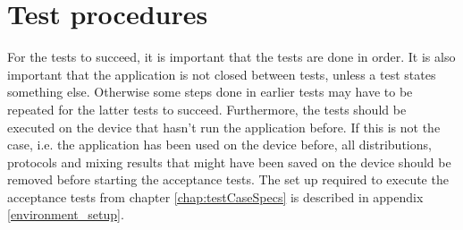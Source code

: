 \chapter{Test procedures}
\label{chap:testProcedures}
For the tests to succeed, it is important that the tests are done in order. It is also important that the application is not closed between tests, unless a test states something else. Otherwise some steps done in earlier tests may have to be repeated for the latter tests to succeed. Furthermore, the tests should be executed on the device that hasn't run the application before. If this is not the case, i.e. the application has been used on the device before, all distributions, protocols and mixing results that might have been saved on the device should be removed before starting the acceptance tests. The set up required to execute the acceptance tests from chapter \ref{chap:testCaseSpecs} is described in appendix \ref{environment_setup}. 